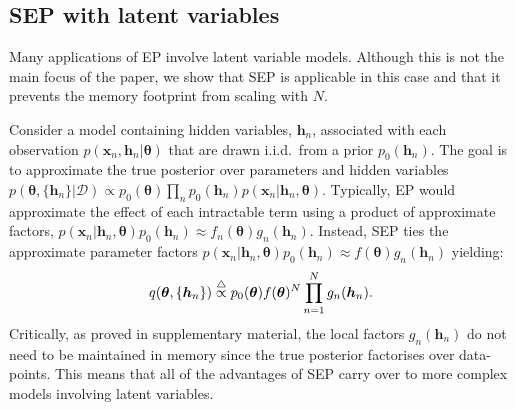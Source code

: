 
\subsection{SEP with latent variables}

Many applications of EP involve latent variable models. Although this is not the main focus of the paper, we show that SEP is applicable in this case and that it prevents the memory footprint from scaling with $N$. 

Consider a model containing hidden variables, $\bm{h}_n$, associated with each observation $p(\bm{x}_n, \bm{h}_n | \bm{\theta})$  that are drawn i.i.d.~from a prior $p_0(\bm{h}_n)$. The goal is to approximate the true posterior over parameters and hidden variables $p(\bm{\theta}, \{ \bm{h}_n\} | \mathcal{D}) \propto p_0(\bm{\theta}) \prod_n p_0(\bm{h}_n) p(\bm{x}_n | \bm{h}_n, \bm{\theta})$. 
%
Typically, EP would approximate the effect of each intractable term using a product of approximate factors, $p(\bm{x}_n | \bm{h}_n, \bm{\theta})p_0(\bm{h}_n)  \approx f_n(\bm{\theta}) g_n(\bm{h}_n) $. Instead, SEP ties the approximate parameter factors $p(\bm{x}_n | \bm{h}_n, \bm{\theta})p_0(\bm{h}_n)  \approx f(\bm{\theta}) g_n(\bm{h}_n) $ yielding:
\begin{equation}
q(\bm{\theta}, \{ \bm{h}_n\}) \buildrel\triangle\over \propto p_0(\bm{\theta}) f(\bm{\theta})^N \prod_{n=1}^N g_n(\bm{h}_n) .
\end{equation}
%
Critically, as proved in supplementary material, the local factors $g_n(\bm{h}_n)$ do not need to be maintained in memory since the true posterior factorises over data-points. This means that all of the advantages of SEP carry over to more complex models involving latent variables.

%
%


